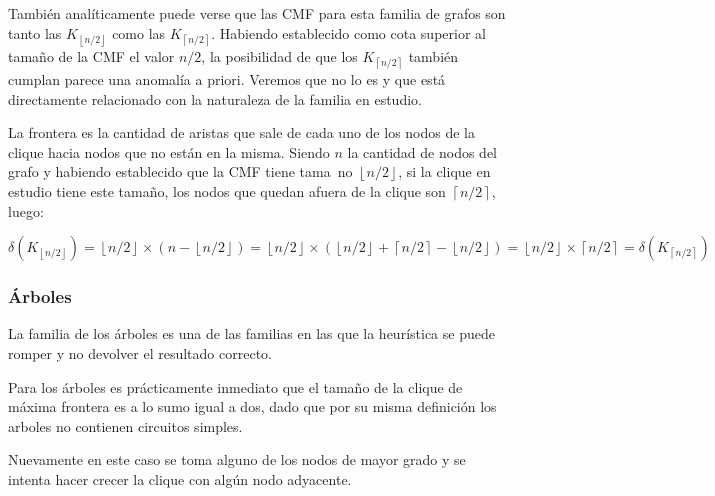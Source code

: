 	Tambi\'en anal\'iticamente puede verse que las CMF para esta 
	familia de grafos son tanto las $K_{\left \lfloor{n/2}\right \rfloor}$ 
	como las $K_{\left \lceil{n/2}\right \rceil}$. Habiendo establecido como
	cota superior al tama\~no de la CMF el valor $n/2$, la posibilidad de que
	los $K_{\left \lceil{n/2}\right \rceil}$ tambi\'en cumplan parece una 
	anomal\'ia a priori. Veremos que no lo es y que est\'a directamente
	relacionado con la naturaleza de la familia en estudio. 

	La frontera es la cantidad de aristas que sale de cada uno de los
	nodos de la clique hacia nodos que no est\'an en la misma. Siendo
	$n$ la cantidad de nodos del grafo y habiendo establecido que la CMF
	tiene tama~no $\left \lfloor{n/2}\right \rfloor$, 
	si la clique en estudio tiene este tama\~no, los nodos que quedan afuera
	de la clique son $\left \lceil{n/2} \right \rceil$, luego: 

	\( 
	\delta(K_{\left \lfloor{n/2}\right \rfloor}) = 
	\left \lfloor{n/2} \right \rfloor \times 
	(n - \left \lfloor{n/2} \right \rfloor ) = 
	\left \lfloor{n/2} \right \rfloor \times 
	(\left \lfloor{n/2} \right \rfloor +
	\left \lceil{n/2} \right \rceil - 
	\left \lfloor{n/2} \right \rfloor) =
	\left \lfloor{n/2} \right \rfloor \times
	\left \lceil{n/2} \right \rceil = 
	\delta(K_{\left \lceil{n/2}\right \rceil})
	\)

\subsubsection{\'Arboles}
La familia de los \'arboles es una de las familias en las que la heur\'istica
se puede romper y no devolver el resultado correcto. 

Para los \'arboles es pr\'acticamente inmediato que el 
tama\~no de la clique de m\'axima frontera es a lo sumo igual a dos, dado
que por su misma definici\'on los arboles no contienen circuitos simples.

Nuevamente en este caso se toma alguno de los nodos de mayor grado 
y se intenta hacer crecer la clique con alg\'un nodo adyacente.

